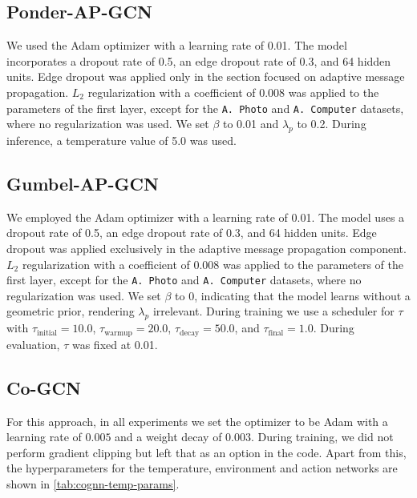 \documentclass{gdl}
\begin{document}
\subsection{Ponder-AP-GCN}
\label{lab:hyper-ponder-gcn}
We used the Adam optimizer with a learning rate of 0.01. The model incorporates a dropout rate of 0.5, an edge dropout rate of 0.3, and 64 hidden units. Edge dropout was applied only in the section focused on adaptive message propagation. $L_2$ regularization with a coefficient of 0.008 was applied to the parameters of the first layer, except for the \texttt{A. Photo} and \texttt{A. Computer} datasets, where no regularization was used. We set $\beta$ to 0.01 and $\lambda_p$ to 0.2. During inference, a temperature value of 5.0 was used.

\subsection{Gumbel-AP-GCN}
\label{lab:hyper-gumbel-gcn}
We employed the Adam optimizer with a learning rate of 0.01. The model uses a dropout rate of 0.5, an edge dropout rate of 0.3, and 64 hidden units. Edge dropout was applied exclusively in the adaptive message propagation component. $L_2$ regularization with a coefficient of 0.008 was applied to the parameters of the first layer, except for the \texttt{A. Photo} and \texttt{A. Computer} datasets, where no regularization was used. We set $\beta$ to 0, indicating that the model learns without a geometric prior, rendering $\lambda_p$ irrelevant. During training we use a scheduler for $\tau$ with $\tau_{\text{initial}} = 10.0$, $\tau_{\text{warmup}} = 20.0$, $\tau_{\text{decay}} = 50.0$, and $\tau_{\text{final}} = 1.0$. During evaluation, $\tau$ was fixed at 0.01.

\subsection{Co-GCN}
\label{lab:hyper-Co-GCN}
For this approach, in all experiments we set the optimizer to be Adam with a learning rate of $0.005$ and a weight decay of $0.003$. During training, we did not perform gradient clipping but left that as an option in the code. Apart from this, the hyperparameters for the temperature, environment and action networks are shown in \autoref{tab:cognn-temp-params}.
\end{document}
